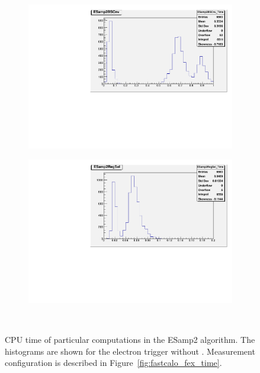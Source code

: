 \begin{figure}[ht]
\begin{subfigure}[c]{.48\textwidth}
\includegraphics[width=\textwidth]{appendices/figures/fastcalo_time/ESamp2BSCnv.pdf}
\centering
\end{subfigure}
\begin{subfigure}[c]{.48\textwidth}
\includegraphics[width=\textwidth]{appendices/figures/fastcalo_time/ESamp2Reg.pdf}
\centering
\end{subfigure} \\
\centering
\caption{CPU time of particular computations in the ESamp2 algorithm. The
histograms are shown for the electron trigger without \rnn.  Measurement
configuration is described in Figure~\ref{fig:fastcalo_fex_time}.}%
\label{fig:fastcalo_samp2_contributions}
\end{figure}

